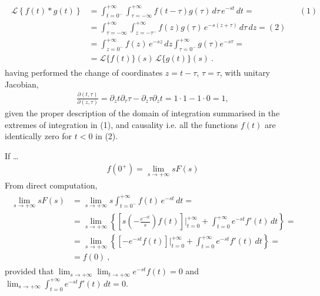 \documentclass[letterpaper,10pt,english]{jupyterBook}
\begin{document}
\sphinxAtStartPar
{}
\begin{equation}\label{equation:ch/complex/laplace-def-thm:laplace:convolution}
\begin{split}\begin{aligned}
  \mathscr{L}\left\{ f(t) \ast g(t) \right\} 
  & = \int_{t=0^-}^{+\infty} \int_{\tau=-\infty}^{+\infty} f(t-\tau) g(\tau) \, d \tau \, e^{-s t }\, dt = && (1) \\
  & = \int_{\tau=-\infty}^{+\infty} \int_{z=-\tau^-}^{+\infty} f(z) g(\tau) \, e^{-s (z + \tau)}\, d\tau \, dz = (2) \\
  & = \int_{z=0^-}^{+\infty} f(z) \, e^{-s z }\, dz \int_{\tau=0^-}^{+\infty} g(\tau) e^{-s \tau} = \\
  & = \mathscr{L}\{ f(t) \}(s) \, \mathscr{L}\{ g(t) \} (s) \ .
\end{aligned}\end{split}
\end{equation}
\sphinxAtStartPar
having performed the change of coordinates \(z = t - \tau\), \(\tau = \tau\), with unitary Jacobian,
\begin{equation*}
\begin{split}\frac{\partial(t,\tau)}{\partial(z,\tau)} = \partial_z t \partial_{\tau} \tau - \partial_z \tau \partial_z t =  1 \cdot 1 - 1 \cdot 0 = 1 ,\end{split}
\end{equation*}
\sphinxAtStartPar
given the proper description of the domain of integration summarised in the extremes of integration in (1), and causality \sphinxhyphen{} i.e. all the functions \(f(t)\) are identically zero for \(t < 0\) \sphinxhyphen{} in (2).

\sphinxAtStartPar
{} If …
\begin{equation*}
\begin{split}f(0^+) = \lim_{s \rightarrow + \infty} s F(s)\end{split}
\end{equation*}
\sphinxAtStartPar
From direct computation,
\begin{equation*}
\begin{split}\begin{aligned}
 \lim_{s \rightarrow +\infty} s F(s)
 & = \lim_{s \rightarrow +\infty} s \int_{t = 0^-}^{+\infty} f(t) \, e^{-st} \, dt = \\
 & = \lim_{s\rightarrow + \infty} \left\{ \left[s \left(-\frac{e^{-st}}{s}\right)f(t) \right]\bigg|_{t=0}^{+\infty} + \int_{t=0}^{+\infty} e^{-st} f'(t) \, dt \right\} = \\
 & = \lim_{s \rightarrow +\infty} \left\{ \left[-e^{-st} f(t) \right]\bigg|_{t=0}^{+\infty} + \int_{t=0}^{+\infty} e^{-st} f'(t) \, dt \right\} = \\
 & = f(0) \ ,
\end{aligned}\end{split}
\end{equation*}
\sphinxAtStartPar
provided that \(\lim_{s \rightarrow +\infty} \lim_{t \rightarrow +\infty} e^{-s t} f(t) = 0\) and \(\lim_{s \rightarrow + \infty} \int_{t=0}^{+\infty} e^{-st} f'(t) \, dt = 0\).
\end{document}
